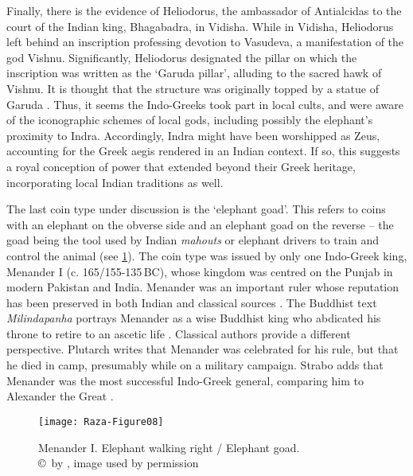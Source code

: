 \documentclass{ijsra}
\renewcommand\BC{{\,BC\xspace}}
\begin{document}
Finally, there is the evidence of Heliodorus, the ambassador of Antialcidas to the court of the Indian king, Bhagabadra, in Vidisha.
While in Vidisha, Heliodorus left behind an inscription professing devotion to Vasudeva, a manifestation of the god Vishnu.
Significantly, Heliodorus designated the pillar on which the inscription was written as the ‘Garuda pillar’, alluding to the sacred hawk of Vishnu.
It is thought that the structure was originally topped by a statue of Garuda \parencite[126--127]{Mairs2014}.
Thus, it seems the Indo-Greeks took part in local cults, and were aware of the iconographic schemes of local gods, including possibly the elephant’s proximity to Indra.
Accordingly, Indra might have been worshipped as Zeus, accounting for the Greek aegis rendered in an Indian context.
If so, this suggests a royal conception of power that extended beyond their Greek heritage, incorporating local Indian traditions as well.

The last coin type under discussion is the ‘elephant goad’.
This refers to coins with an elephant on the obverse side and an elephant goad on the reverse – the goad being the tool used by Indian \emph{mahouts} or elephant drivers to train and control the animal (see \cref{fig:Raza-Figure08}).
The coin type was issued by only one Indo-Greek king, Menander I (c. 165/155-135\BC), whose kingdom was centred on the Punjab in modern Pakistan and India.
Menander was an important ruler whose reputation has been preserved in both Indian and classical sources \parencite[14--17]{Bopearachchi1993}.
The Buddhist text \emph{Milindapanha} portrays Menander as a wise Buddhist king who abdicated his throne to retire to an ascetic life \parencite[14--17]{Bopearachchi1993}.
Classical authors provide a different perspective.
Plutarch writes that Menander was celebrated for his rule, but that he died in camp, presumably while on a military campaign.
Strabo adds that Menander was the most successful Indo-Greek general, comparing him to Alexander the Great \parencites[180--183]{Holt1999}[]{Strab. Geo. 11.11.1}[]{Plut. Mor. 821d}.

\begin{figure}[!htb] %
	\centering
	\texttt{[image: Raza-Figure08]}
	\caption{Menander I. Elephant walking right / Elephant goad.
		{\normalfont\scriptsize \\ \copyright\ by \cite{Coin}, image used by permission}}
	\label{fig:Raza-Figure08}
\end{figure}
\end{document}
